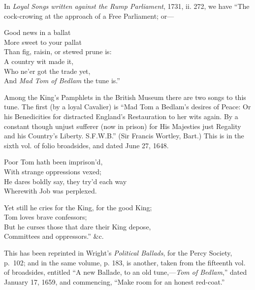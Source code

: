 In \textit{Loyal Songs written against the Rump Parliament}, 1731, ii. 272, we have
“The cock-crowing at the approach of a Free Parliament; or—
\settowidth{\versewidth}{Than fig, raisin, or stewed prune is:}
\begin{dcverse}
\begin{patverse}
\vin Good news in a ballat\\
More sweet to your pallat\\
Than fig, raisin, or stewed prune is:\\
A country wit made it,\\
Who ne’er got the trade yet,\\
And \textit{Mad Tom of Bedlam} the tune is.”
\end{patverse}
\end{dcverse}

\pagebreak

Among the King’s Pamphlets in the British Museum there are two songs to
this tune. The first (by a loyal Cavalier) is “Mad Tom a Bedlam’s desires of
Peace: Or his Benedicities for distracted England’s Restauration to her wits
again. By a constant though unjust sufferer (now in prison) for His Majesties
just Regality and his Country’s Liberty. S.F.W.B.” (Sir Francis Wortley,
Bart.) This is in the sixth vol. of folio broadsides, and dated June 27, 1648.
\settowidth{\versewidth}{Yet still he cries for the King, for the good King;}
\begin{dcverse}\begin{altverse}
Poor Tom hath been imprison’d,\\
With strange oppressions vexed;\\
He dares boldly say, they try'd each way\\
Wherewith Job was perplexed.
\end{altverse}

\begin{altverse}
Yet still he cries for the King, for the good King;\\
Tom loves brave confessors; \\
But he curses those that dare their King depose,\\
Committees and oppressors.” \&c.
\end{altverse}
\end{dcverse}
This has been reprinted in Wright’s \textit{Political Ballads}, for the Percy Society,
p.~102; and in the same volume, p. 183, is another, taken from the fifteenth vol.
of broadsides, entitled “A new Ballade, to an old tune,—\textit{Tom of Bedlam},” dated
January 17, 1659, and commencing, “Make room for an honest red-coat.”

